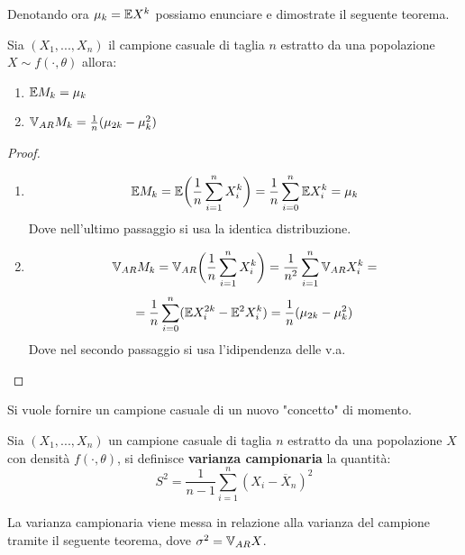 Denotando ora $\mu_k=\mathbb{E} X^k$ possiamo enunciare e dimostrate il seguente teorema.

\begin{theorem}
Sia $(X_1,...,X_n)$ il campione casuale di taglia $n$ estratto da una popolazione $X\sim f(\cdot,\theta)$ allora:
\begin{enumerate}
    \item $\mathbb{E} M_k=\mu_k$
    \item $\mathbb{V}_{AR} M_k=\frac{1}{n}(\mu_{2k}-\mu_k^2)$
\end{enumerate}
\begin{proof}
\begin{enumerate}
    \item \[\mathbb{E} M_k=\mathbb{E}\bigg(\frac{1}{n}\sum_{i=1}^nX_i^k\bigg)=\frac{1}{n}\sum_{i=0}^n\mathbb{E} X_i^k=\mu_k\]
    Dove nell'ultimo passaggio si usa la identica distribuzione.
    \item \[\mathbb{V}_{AR} M_k=\mathbb{V}_{AR} \bigg(\frac{1}{n}\sum_{i=1}^nX_i^k\bigg)= \frac{1}{n^2}\sum_{i=1}^n\mathbb{V}_{AR} X_i^k=\]
    \[=\frac{1}{n}\sum_{i=0}^n(\mathbb{E} X_i^{2k}-\mathbb{E}^2 X_i^k)=\frac{1}{n}(\mu_{2k}-\mu_k^2)\]
    Dove nel secondo passaggio si usa l'idipendenza delle v.a.
\end{enumerate}
\end{proof}
\end{theorem}

\vspace{10px}

Si vuole fornire un campione casuale di un nuovo "concetto" di momento.

\begin{definition}
Sia $(X_1,...,X_n)$ un campione casuale di taglia $n$ estratto da una popolazione $X$ con densità $f(\cdot,\theta)$, si definisce \textbf{varianza campionaria} la quantità: \[S^2=\frac{1}{n-1}\sum_{i=1}^n(X_i-\overline{X}_n)^2\]
\end{definition}
\vspace{10px}

La varianza campionaria viene messa in relazione alla varianza del campione tramite il seguente teorema, dove $\sigma^2=\mathbb{V}_{AR} X$.

